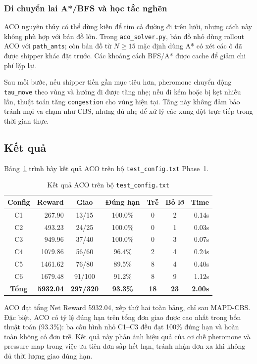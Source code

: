 \documentclass[conference]{IEEEtran}
\begin{document}
\subsubsection{Di chuyển lai A*/BFS và học tắc nghẽn}
ACO nguyên thủy có thể dùng kiến để tìm cả đường đi trên lưới, nhưng cách này không phù hợp với bản đồ lớn. Trong \texttt{aco\_solver.py}, bản đồ nhỏ dùng rollout ACO với \texttt{path\_ants}; còn bản đồ từ $N \ge 15$ mặc định dùng A* có xét các ô đã được shipper khác đặt trước. Các khoảng cách BFS/A* được cache để giảm chi phí lặp lại.

Sau mỗi bước, nếu shipper tiến gần mục tiêu hơn, pheromone chuyển động \texttt{tau\_move} theo vùng và hướng đi được tăng nhẹ; nếu đi kém hoặc bị kẹt nhiều lần, thuật toán tăng \texttt{congestion} cho vùng hiện tại. Tầng này không đảm bảo tránh mọi va chạm như CBS, nhưng đủ nhẹ để xử lý các xung đột trực tiếp trong thời gian thực.

\subsection{Kết quả}
Bảng~\ref{tab:aco-phase1} trình bày kết quả ACO trên bộ \texttt{test\_config.txt} Phase~1.

\begin{table}[htbp]
\caption{Kết quả ACO trên bộ \texttt{test\_config.txt}}
\label{tab:aco-phase1}
\centering
\footnotesize
\begin{tabular}{|c|r|c|c|c|c|r|}
\hline
\textbf{Config} & \textbf{Reward} & \textbf{Giao} & \textbf{Đúng hạn} & \textbf{Trễ} & \textbf{Bỏ lỡ} & \textbf{Time} \\
\hline
C1 &  267.90  & 13/15  & 100.0\% & 0 & 2 & 0.14s \\
C2 &  493.23  & 24/25  & 100.0\% & 0 & 1 & 0.03s \\
C3 &  949.96  & 37/40  & 100.0\% & 0 & 3 & 0.07s \\
C4 & 1079.86  & 56/60  &  96.4\% & 2 & 4 & 0.24s \\
C5 & 1461.62  & 76/80  &  89.5\% & 8 & 4 & 0.40s \\
C6 & 1679.48  & 91/100 &  91.2\% & 8 & 9 & 1.12s \\
\hline
\textbf{Tổng} & \textbf{5932.04} & \textbf{297/320} & \textbf{93.3\%} & \textbf{18} & \textbf{23} & \textbf{2.00s} \\
\hline
\end{tabular}
\end{table}

ACO đạt tổng Net Reward 5932.04, xếp thứ hai toàn bảng, chỉ sau MAPD-CBS. Đặc biệt, ACO có tỷ lệ đúng hạn trên tổng đơn giao được cao nhất trong bốn thuật toán (93.3\%): ba cấu hình nhỏ C1--C3 đều đạt 100\% đúng hạn và hoàn toàn không có đơn trễ. Kết quả này phản ánh hiệu quả của cơ chế pheromone và pressure map trong việc ưu tiên đơn sắp hết hạn, tránh nhận đơn xa khi không đủ thời lượng giao đúng hạn.
\end{document}

